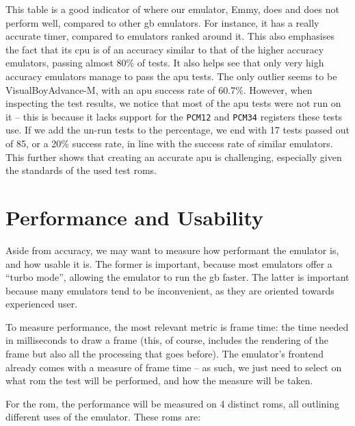\documentclass[11pt]{informatics-report}
\begin{document}
This table is a good indicator of where our emulator, Emmy, does and does not perform well, compared to other \gls{gb} emulators. For instance, it has a really accurate timer, compared to emulators ranked around it. This also emphasises the fact that its \gls{cpu} is of an accuracy similar to that of the higher accuracy emulators, passing almost 80\% of tests. It also helps see that only very high accuracy emulators manage to pass the \gls{apu} tests. The only outlier seems to be VisualBoyAdvance-M, with an \gls{apu} success rate of 60.7\%. However, when inspecting the test results, we notice that most of the \gls{apu} tests were not run on it -- this is because it lacks support for the \texttt{PCM12} and \texttt{PCM34} registers these tests use. If we add the un-run tests to the percentage, we end with 17 tests passed out of 85, or a 20\% success rate, in line with the success rate of similar emulators. This further shows that creating an accurate \gls{apu} is challenging, especially given the standards of the used test \glspl{rom}.

\section{Performance and Usability}

Aside from accuracy, we may want to measure how performant the emulator is, and how usable it is. The former is important, because most emulators offer a ``turbo mode'', allowing the emulator to run the \gls{gb} faster. The latter is important because many emulators tend to be inconvenient, as they are oriented towards experienced user.

To measure performance, the most relevant metric is frame time: the time needed in milliseconds to draw a frame (this, of course, includes the rendering of the frame but also all the processing that goes before). The emulator's frontend already comes with a measure of frame time -- as such, we just need to select on what \gls{rom} the test will be performed, and how the measure will be taken.

For the \gls{rom}, the performance will be measured on 4 distinct \glspl{rom}, all outlining different uses of the emulator. These \glspl{rom} are:
\end{document}
